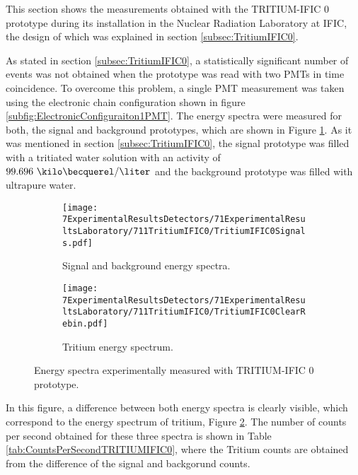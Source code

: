 This section shows the measurements obtained with the TRITIUM-IFIC 0 prototype during its installation in the Nuclear Radiation Laboratory at IFIC, the design of which was explained in section \ref{subsec:TritiumIFIC0}.

As stated in section \ref{subsec:TritiumIFIC0}, a statistically significant number of events was not obtained when the prototype was read with two PMTs in time coincidence. To overcome this problem, a single PMT measurement was taken using the electronic chain configuration shown in figure \ref{subfig:ElectronicConfiguraiton1PMT}. The energy spectra were measured for both, the signal and background prototypes, which are shown in Figure \ref{subfig:SignalBackgroundEnergySpectraTritiumIFIC0}. As it was mentioned in section \ref{subsec:TritiumIFIC0}, the signal prototype was filled with a tritiated water solution with an activity of $99.696~\kilo\becquerel/\liter$ and the background prototype was filled with ultrapure water.

\begin{figure}
\centering
    \begin{subfigure}[b]{1\textwidth}
    \centering
    \texttt{[image: 7ExperimentalResultsDetectors/71ExperimentalResultsLaboratory/711TritiumIFIC0/TritiumIFIC0Signals.pdf]}  
    \caption{Signal and background energy spectra.\label{subfig:SignalBackgroundEnergySpectraTritiumIFIC0}}
    \end{subfigure}
    \hfill
    \begin{subfigure}[b]{1\textwidth}
    \centering
    \texttt{[image: 7ExperimentalResultsDetectors/71ExperimentalResultsLaboratory/711TritiumIFIC0/TritiumIFIC0ClearRebin.pdf]}  
    \caption{Tritium energy spectrum.\label{subfig:TritiumEnergySpectraTritiumIFIC0}}
    \end{subfigure}
 \caption{Energy spectra experimentally measured with TRITIUM-IFIC 0 prototype.}
 \label{fig:EnergySpectraTRITIUMIFIC0}
\end{figure}


In this figure, a difference between both energy spectra is clearly visible, which correspond to the energy spectrum of tritium, Figure \ref{subfig:TritiumEnergySpectraTritiumIFIC0}. The number of counts per second obtained for these three spectra is shown in Table \ref{tab:CountsPerSecondTRITIUMIFIC0}, where the Tritium counts are obtained from the difference of the signal and backgorund counts.

